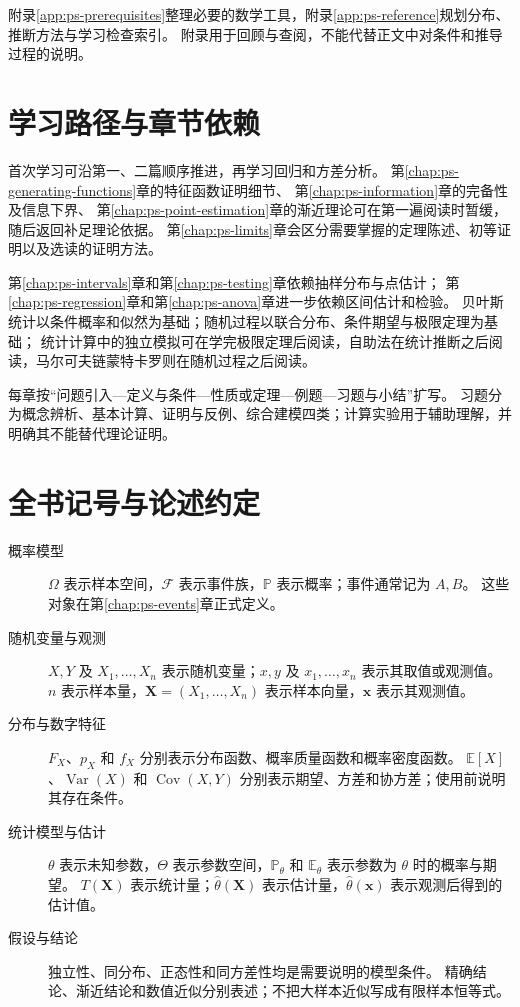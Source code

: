 附录\ref{app:ps-prerequisites}整理必要的数学工具，附录\ref{app:ps-reference}规划分布、推断方法与学习检查索引。
附录用于回顾与查阅，不能代替正文中对条件和推导过程的说明。

\section*{学习路径与章节依赖}

首次学习可沿第一、二篇顺序推进，再学习回归和方差分析。
第\ref{chap:ps-generating-functions}章的特征函数证明细节、
第\ref{chap:ps-information}章的完备性及信息下界、
第\ref{chap:ps-point-estimation}章的渐近理论可在第一遍阅读时暂缓，随后返回补足理论依据。
第\ref{chap:ps-limits}章会区分需要掌握的定理陈述、初等证明以及选读的证明方法。

第\ref{chap:ps-intervals}章和第\ref{chap:ps-testing}章依赖抽样分布与点估计；
第\ref{chap:ps-regression}章和第\ref{chap:ps-anova}章进一步依赖区间估计和检验。
贝叶斯统计以条件概率和似然为基础；随机过程以联合分布、条件期望与极限定理为基础；
统计计算中的独立模拟可在学完极限定理后阅读，自助法在统计推断之后阅读，马尔可夫链蒙特卡罗则在随机过程之后阅读。

每章按“问题引入---定义与条件---性质或定理---例题---习题与小结”扩写。
习题分为概念辨析、基本计算、证明与反例、综合建模四类；计算实验用于辅助理解，并明确其不能替代理论证明。

\section*{全书记号与论述约定}

\begin{description}
  \item[概率模型]
  $\Omega$ 表示样本空间，$\mathcal F$ 表示事件族，$\mathbb P$ 表示概率；事件通常记为 $A,B$。
  这些对象在第\ref{chap:ps-events}章正式定义。
  \item[随机变量与观测]
  $X,Y$ 及 $X_1,\ldots,X_n$ 表示随机变量；$x,y$ 及 $x_1,\ldots,x_n$ 表示其取值或观测值。
  $n$ 表示样本量，$\mathbf X=(X_1,\ldots,X_n)$ 表示样本向量，$\mathbf x$ 表示其观测值。
  \item[分布与数字特征]
  $F_X$、$p_X$ 和 $f_X$ 分别表示分布函数、概率质量函数和概率密度函数。
  $\mathbb E[X]$、$\operatorname{Var}(X)$ 和 $\operatorname{Cov}(X,Y)$ 分别表示期望、方差和协方差；使用前说明其存在条件。
  \item[统计模型与估计]
  $\theta$ 表示未知参数，$\Theta$ 表示参数空间，$\mathbb P_\theta$ 和 $\mathbb E_\theta$ 表示参数为 $\theta$ 时的概率与期望。
  $T(\mathbf X)$ 表示统计量；$\widehat\theta(\mathbf X)$ 表示估计量，$\widehat\theta(\mathbf x)$ 表示观测后得到的估计值。
  \item[假设与结论]
  独立性、同分布、正态性和同方差性均是需要说明的模型条件。
  精确结论、渐近结论和数值近似分别表述；不把大样本近似写成有限样本恒等式。
\end{description}


